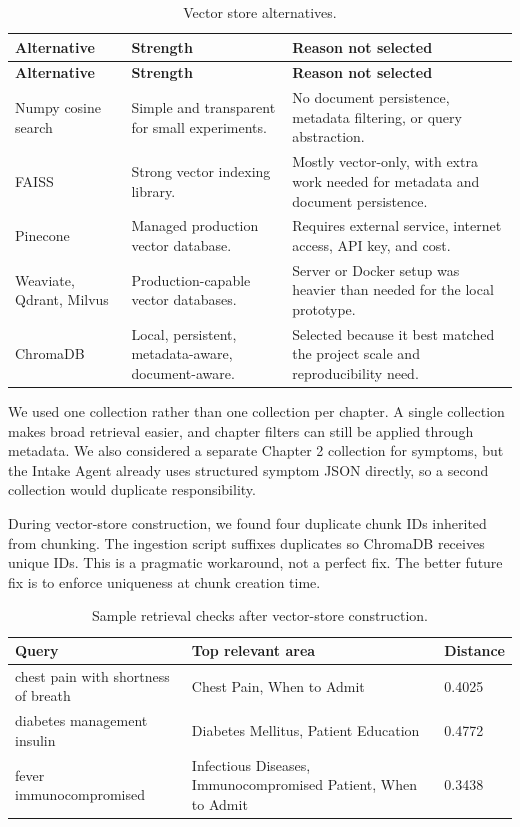 \begin{longtable}{p{} p{} p{}}
\caption{Vector store alternatives.}
\label{tab:vector_store_alternatives}\\
\toprule
\textbf{Alternative} & \textbf{Strength} & \textbf{Reason not selected}\\
\midrule
\endfirsthead
\toprule
\textbf{Alternative} & \textbf{Strength} & \textbf{Reason not selected}\\
\midrule
\endhead
Numpy cosine search & Simple and transparent for small experiments. & No document persistence, metadata filtering, or query abstraction.\\
FAISS & Strong vector indexing library. & Mostly vector-only, with extra work needed for metadata and document persistence.\\
Pinecone & Managed production vector database. & Requires external service, internet access, API key, and cost.\\
Weaviate, Qdrant, Milvus & Production-capable vector databases. & Server or Docker setup was heavier than needed for the local prototype.\\
ChromaDB & Local, persistent, metadata-aware, document-aware. & Selected because it best matched the project scale and reproducibility need.\\
\bottomrule
\end{longtable}

We used one collection rather than one collection per chapter. A single collection makes broad retrieval easier, and chapter filters can still be applied through metadata. We also considered a separate Chapter 2 collection for symptoms, but the Intake Agent already uses structured symptom JSON directly, so a second collection would duplicate responsibility.

During vector-store construction, we found four duplicate chunk IDs inherited from chunking. The ingestion script suffixes duplicates so ChromaDB receives unique IDs. This is a pragmatic workaround, not a perfect fix. The better future fix is to enforce uniqueness at chunk creation time.

\begin{table}[htbp]
\centering
\caption{Sample retrieval checks after vector-store construction.}
\label{tab:example_vector_queries}
\begin{tabular}{p{} p{} p{}}
\toprule
\textbf{Query} & \textbf{Top relevant area} & \textbf{Distance}\\
\midrule
chest pain with shortness of breath & Chest Pain, When to Admit & 0.4025\\
diabetes management insulin & Diabetes Mellitus, Patient Education & 0.4772\\
fever immunocompromised & Infectious Diseases, Immunocompromised Patient, When to Admit & 0.3438\\
\bottomrule
\end{tabular}
\end{table}

